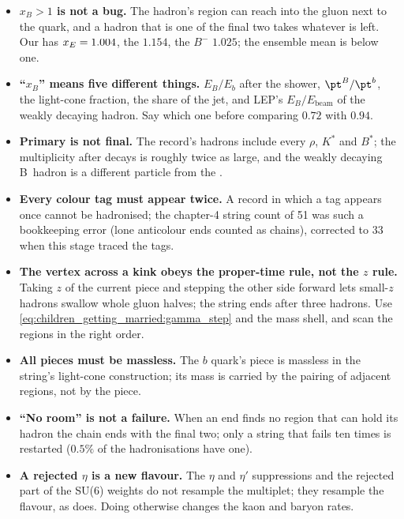 \begin{pitfalls}
\begin{itemize}[nosep]
  \item \textbf{$x_B>1$ is not a bug.} The hadron's region can reach into
    the gluon next to the quark, and a hadron that is one of the final two
    takes whatever is left. Our \Bstarbar has $x_E=1.004$, the \Bstar
    $1.154$, the \CMSSW $B^-$ $1.025$; the ensemble mean is below one.
  \item \textbf{``$x_B$'' means five different things.} $E_B/E_b$ after
    the shower, $\pt^B/\pt^b$, the light-cone fraction, the share of the
    jet, and LEP's $E_B/E_{\mathrm{beam}}$ of the weakly decaying hadron.
    Say which one before comparing $0.72$ with $0.94$.
  \item \textbf{Primary is not final.} The record's hadrons include
    every $\rho$, $K^*$ and $B^*$; the multiplicity after decays is roughly
    twice as large, and the weakly decaying B~hadron is a different
    particle from the \Bstarbar.
  \item \textbf{Every colour tag must appear twice.} A record in which a
    tag appears once cannot be hadronised; the chapter-4 string count of
    51 was such a bookkeeping error (lone anticolour ends counted as
    chains), corrected to 33 when this stage traced the tags.
  \item \textbf{The vertex across a kink obeys the proper-time rule, not the
    $z$ rule.} Taking $z$ of the current piece and stepping the other side
    forward lets small-$z$ hadrons swallow whole gluon halves; the string
    ends after three hadrons. Use \cref{eq:children_getting_married:gamma_step}
    and the mass shell, and scan the regions in the right order.
  \item \textbf{All pieces must be massless.} The $b$ quark's piece is
    massless in the string's light-cone construction; its mass is carried
    by the pairing of adjacent regions, not by the piece.
  \item \textbf{``No room'' is not a failure.} When an end finds no region
    that can hold its hadron the chain ends with the final two; only a
    string that fails ten times is restarted ($0.5\%$ of the
    hadronisations have one).
  \item \textbf{A rejected $\eta$ is a new flavour.} The $\eta$ and
    $\eta'$ suppressions and the rejected part of the SU(6) weights do
    not resample the multiplet; they resample the flavour, as \PYTHIA does.
    Doing otherwise changes the kaon and baryon rates.

\end{itemize}
\end{pitfalls}
